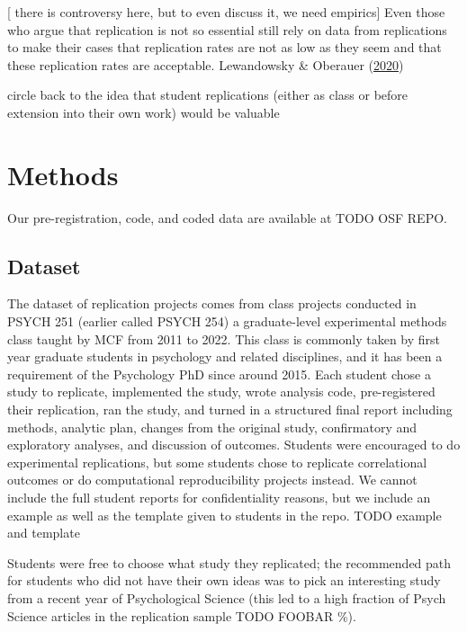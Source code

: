 \documentclass[
  english,
  a4paper,
]{article}
\begin{document}
{[} there is controversy here, but to even discuss it, we need empirics{]} Even those who argue that replication is not so essential still rely on data from replications to make their cases that replication rates are not as low as they seem and that these replication rates are acceptable. Lewandowsky \& Oberauer (\protect\hyperlink{ref-lewandowsky2020}{2020})

circle back to the idea that student replications (either as class or before extension into their own work) would be valuable

\hypertarget{methods}{%
\section{Methods}\label{methods}}

Our pre-registration, code, and coded data are available at TODO OSF REPO.

\hypertarget{dataset}{%
\subsection{Dataset}\label{dataset}}

The dataset of replication projects comes from class projects conducted in PSYCH 251 (earlier called PSYCH 254) a graduate-level experimental methods class taught by MCF from 2011 to 2022. This class is commonly taken by first year graduate students in psychology and related disciplines, and it has been a requirement of the Psychology PhD since around 2015. Each student chose a study to replicate, implemented the study, wrote analysis code, pre-registered their replication, ran the study, and turned in a structured final report including methods, analytic plan, changes from the original study, confirmatory and exploratory analyses, and discussion of outcomes. Students were encouraged to do experimental replications, but some students chose to replicate correlational outcomes or do computational reproducibility projects instead. We cannot include the full student reports for confidentiality reasons, but we include an example as well as the template given to students in the repo. TODO example and template

Students were free to choose what study they replicated; the recommended path for students who did not have their own ideas was to pick an interesting study from a recent year of Psychological Science (this led to a high fraction of Psych Science articles in the replication sample TODO FOOBAR \%).
\end{document}
